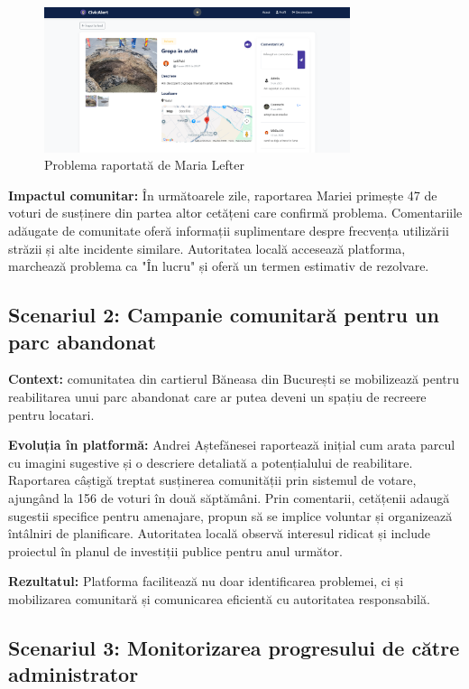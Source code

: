 \documentclass[12pt,a4paper]{report}
\begin{document}
\begin{figure}[H]
    \centering
    \includegraphics[width=0.8\textwidth]{groapa in asfalt.png}
    \caption{Problema raportată de Maria Lefter}
    \label{fig:groapa}
\end{figure}

\textbf{Impactul comunitar:} În următoarele zile, raportarea Mariei primește 47 de voturi de susținere din partea altor cetățeni care confirmă problema. Comentariile adăugate de comunitate oferă informații suplimentare despre frecvența utilizării străzii și alte incidente similare. Autoritatea locală accesează platforma, marchează problema ca "În lucru" și oferă un termen estimativ de rezolvare.


\subsection{Scenariul 2: Campanie comunitară pentru un parc abandonat}

\textbf{Context:} comunitatea din cartierul Băneasa din București se mobilizează pentru reabilitarea unui parc abandonat care ar putea deveni un spațiu de recreere pentru locatari.

\textbf{Evoluția în platformă:}
Andrei Aștefănesei raportează inițial cum arata  parcul cu imagini sugestive și o descriere detaliată a potențialului de reabilitare. Raportarea câștigă treptat susținerea comunității prin sistemul de votare, ajungând la 156 de voturi în două săptămâni. Prin comentarii, cetățenii adaugă sugestii specifice pentru amenajare, propun să se implice voluntar și organizează întâlniri de planificare. Autoritatea locală observă interesul ridicat și include proiectul în planul de investiții publice pentru anul următor.

\textbf{Rezultatul:} Platforma facilitează nu doar identificarea problemei, ci și mobilizarea comunitară și comunicarea eficientă cu autoritatea responsabilă.

\subsection{Scenariul 3: Monitorizarea progresului de către administrator}
\end{document}
